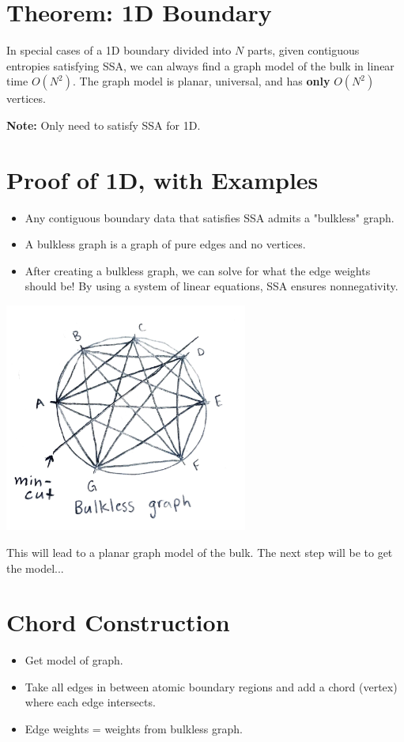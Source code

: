 \documentclass[12pt]{article}
\begin{document}
\newpage

\section*{Theorem: 1D Boundary}
In special cases of a 1D boundary divided into \( N \) parts, given contiguous entropies satisfying SSA, we can always find a graph model of the bulk in linear time \( O(N^2) \). The graph model is planar, universal, and has \textbf{only} \( O(N^2) \) vertices.

\textbf{Note:} Only need to satisfy SSA for 1D.

\section*{Proof of 1D, with Examples}
\begin{itemize}
    \item Any contiguous boundary data that satisfies SSA admits a "bulkless" graph.
    \item A bulkless graph is a graph of pure edges and no vertices.
    \item After creating a bulkless graph, we can solve for what the edge weights should be! By using a system of linear equations, SSA ensures nonnegativity.
\end{itemize}


\begin{center}
    \includegraphics[width=0.6\textwidth]{bulkless_graph.pdf}
\end{center}

This will lead to a planar graph model of the bulk. The next step will be to get the model...

\section*{Chord Construction}
\begin{itemize}
    \item Get model of graph.
    \item Take all edges in between atomic boundary regions and add a chord (vertex) where each edge intersects.
    \item Edge weights = weights from bulkless graph.
\end{itemize}
\end{document}
